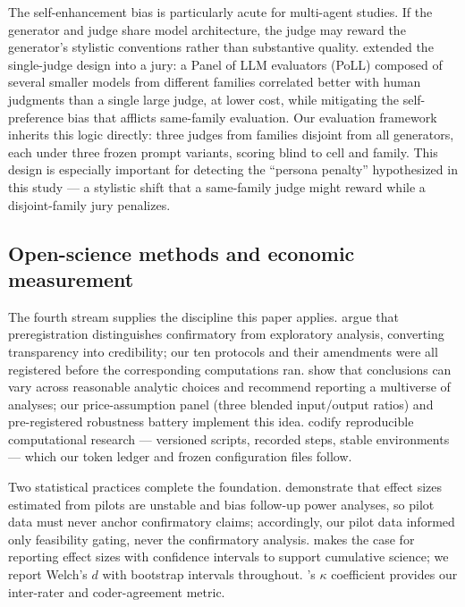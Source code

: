 \documentclass[12pt,a4paper]{article}
\begin{document}
The self-enhancement bias is particularly acute for multi-agent studies. If the
generator and judge share model architecture, the judge may reward the
generator's stylistic conventions rather than substantive quality.
\citet{VergaEtAl2024} extended the single-judge design into a jury: a Panel of
LLM evaluators (PoLL) composed of several smaller models from different
families correlated better with human judgments than a single large judge, at
lower cost, while mitigating the self-preference bias that afflicts same-family
evaluation. Our evaluation framework inherits this logic directly: three judges
from families disjoint from all generators, each under three frozen prompt
variants, scoring blind to cell and family. This design is especially important
for detecting the ``persona penalty'' hypothesized in this study --- a stylistic
shift that a same-family judge might reward while a disjoint-family jury
penalizes.

\subsection{Open-science methods and economic measurement}

The fourth stream supplies the discipline this paper applies. \citet{NosekEtAl2018}
argue that preregistration distinguishes confirmatory from exploratory
analysis, converting transparency into credibility; our ten protocols and their
amendments were all registered before the corresponding computations ran.
\citet{SteegenEtAl2016} show that conclusions can vary across reasonable
analytic choices and recommend reporting a multiverse of analyses; our
price-assumption panel (three blended input/output ratios) and pre-registered
robustness battery implement this idea. \citet{SandveEtAl2013} codify
reproducible computational research --- versioned scripts, recorded steps,
stable environments --- which our token ledger and frozen configuration files
follow.

Two statistical practices complete the foundation. \citet{AlbersLakens2018}
demonstrate that effect sizes estimated from pilots are unstable and bias
follow-up power analyses, so pilot data must never anchor confirmatory claims;
accordingly, our pilot data informed only feasibility gating, never the
confirmatory analysis. \citet{Lakens2013} makes the case for reporting effect sizes with
confidence intervals to support cumulative science; we report Welch's $d$ with
bootstrap intervals throughout. \citet{Cohen1960}'s $\kappa$ coefficient
provides our inter-rater and coder-agreement metric.
\end{document}
